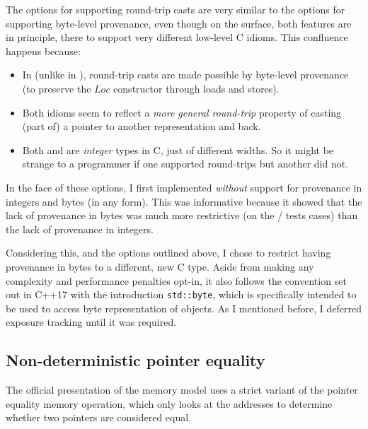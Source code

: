 The options for supporting round-trip casts are very similar to the options for
supporting byte-level provenance, even though on the surface, both features are
in principle, there to support very different low-level C idioms. This confluence
happens because:
\begin{itemize}
    \item In  (unlike in ), round-trip casts are made
        possible by byte-level provenance (to preserve the $\mathit{Loc}$
        constructor through loads and stores).
    \item Both idioms seem to reflect a \emph{more general round-trip} property
        of casting (part of) a pointer to another representation and back.
    \item Both  and  are \emph{integer} types in
        C, just of different widths. So it might be strange to a programmer if
        one supported round-trips but another did not.
\end{itemize}

In the face of these options, I first implemented  \emph{without}
support for provenance in integers and bytes (in any form). This was
informative because it showed that the lack of provenance in bytes was much
more restrictive (on the / tests cases) than the lack
of provenance in integers.

Considering this, and the options outlined above, I chose to restrict having
provenance in bytes to a different, new C type. Aside from making any
complexity and performance penalties opt-in, it also follows the convention set
out in C++17 with the introduction \texttt{std::byte}, which is
specifically intended to be used to access byte representation of objects. As I
mentioned before, I deferred exposure tracking until it was required.

\subsection{Non-deterministic pointer equality}\label{subsec:non-det-ptr-eq}

The official presentation of the  memory model uses a strict variant of
the pointer equality memory operation, which only looks at the addresses to
determine whether two pointers are considered equal.

